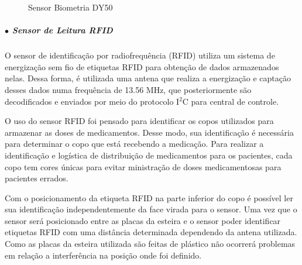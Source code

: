     \begin{figure}[H]
        \centering
        \hspace{0.1\textwidth}
        \caption{Sensor Biometria DY50}\label{fig:sensor_biometria}
    \end{figure}
    
    \subparagraph*{$\bullet$ Sensor de Leitura RFID} \hfill
    
    O sensor de identificação por radiofrequência (RFID) utiliza um sistema de energização sem fio de etiquetas RFID para obtenção de dados armazenados nelas. Dessa forma, é utilizada uma antena que realiza a energização e captação desses dados numa frequência de 13.56 MHz, que posteriormente são decodificados e enviados por meio do protocolo I$^2$C para central de controle. 
    
    O uso do sensor RFID foi pensado para identificar os copos utilizados para armazenar as doses de medicamentos. Desse modo, sua identificação é necessária para determinar o copo que está recebendo a medicação. Para realizar a identificação e logística de distribuição de medicamentos para os pacientes, cada copo tem cores únicas para evitar ministração de doses medicamentosas para pacientes errados. 
    
    Com o posicionamento da etiqueta RFID na parte inferior do copo é possível ler sua identificação independentemente da face virada para o sensor. Uma vez que o sensor será posicionado entre as placas da esteira e o sensor poder identificar etiquetas RFID com uma distância determinada dependendo da antena utilizada. Como as placas da esteira utilizada são feitas de plástico não ocorrerá problemas em relação a interferência na posição onde foi definido. 
    
